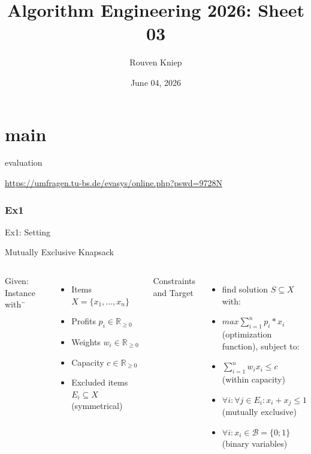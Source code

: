 \documentclass[fleqn,11pt,aspectratio=169]{beamer}
\date{June 04, 2026}
\title{Algorithm Engineering 2026: Sheet 03}
\author{Rouven Kniep}
\begin{document}
\part{main}
\begin{frame}[plain]
	\titlepage
\end{frame}	

\begin{frame}{evaluation}
	\begin{center}
		
		\vspace{15pt}
		
		\url{https://umfragen.tu-bs.de/evasys/online.php?pswd=9728N}
	\end{center}
	
\end{frame}


\section{Ex1}

\begin{frame}{Ex1: Setting}
	\begin{center}
		Mutually Exclusive Knapsack
	\end{center}
	\begin{columns}[T]
		Given: Instance with¨
		\begin{itemize}
			\item Items $X = \{x_1,\dots,x_n\}$
			\item Profits $p_i \in \mathbb{R}_{\geq0}$
			\item Weights $w_i \in \mathbb{R}_{\geq0}$
			\item Capacity $c \in \mathbb{R}_{\geq0}$
			\item Excluded items $E_i \subseteq X$ (symmetrical)
		\end{itemize}
		Constraints and Target
		\begin{itemize}
			\item find solution $S \subseteq X$ with:
			\item $max \sum_{i=1}^{n} p_i*x_i$ \\(optimization function), subject to:
			\item $\sum_{i=1}^{n} w_ix_i \leq c$ (within capacity)
			\item $\forall i: \forall j\in E_i: x_i+x_j \leq 1$ \\(mutually exclusive)
			\item $\forall i: x_i \in \mathcal{B} = \{0;1\}$ (binary variables)
		\end{itemize}
	\end{columns}
\end{frame}
\end{document}

